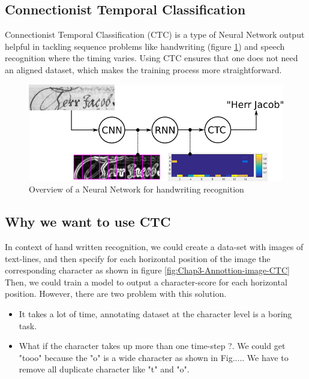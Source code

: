 \subsection{ Connectionist Temporal Classification }
Connectionist Temporal Classification (CTC) is a type of Neural Network output helpful
in tackling sequence problems like handwriting (figure \ref{fig:Chap3-Overview-CTC}) and speech recognition where the timing varies.
Using CTC ensures that one does not need an aligned dataset, which makes the training process
more straightforward.
\begin{figure}[H]
	\centering
	\includegraphics[width=\textwidth]{img/Chap3/Overview-CTC}
	\caption{ Overview of a Neural Network for handwriting recognition }
	\label{fig:Chap3-Overview-CTC}
\end{figure}

\subsection{ Why we want to use CTC }
In context of hand written recognition, we could create a data-set with
images of text-lines, and then specify for each horizontal position of the image
the corresponding character as shown in figure \ref{fig:Chap3-Annottion-image-CTC} Then, we could train a model to output
a character-score for each horizontal position. However, there are two problem with this
solution.
\begin{itemize}
	\item It takes a lot of time, annotating dataset at the character level is a boring task.
	\item What if the character takes up more than one time-step ?. We could get "tooo" because
	      the "o" is a wide character as shown in Fig..... We have to remove all duplicate character
	      like "t" and "o".
\end{itemize}

